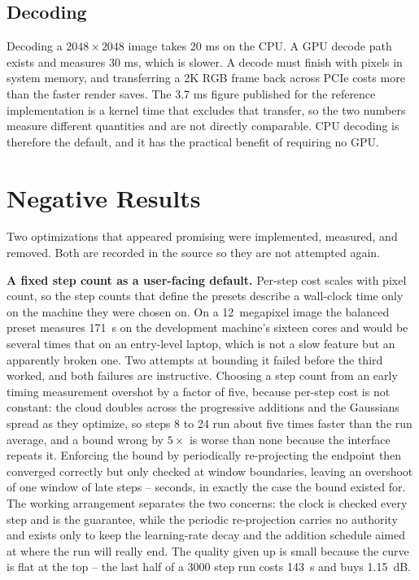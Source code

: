 \documentclass[11pt,a4paper]{article}
\begin{document}
\subsection{Decoding}

Decoding a $2048\times2048$ image takes 20 ms on the CPU. A GPU decode path exists and measures 30 ms, which is slower. A decode must finish with pixels in system memory, and transferring a 2K RGB frame back across PCIe costs more than the faster render saves. The 3.7 ms figure published for the reference implementation is a kernel time that excludes that transfer, so the two numbers measure different quantities and are not directly comparable. CPU decoding is therefore the default, and it has the practical benefit of requiring no GPU.

\newpage

\section{Negative Results}

Two optimizations that appeared promising were implemented, measured, and removed. Both are recorded in the source so they are not attempted again.

\textbf{A fixed step count as a user-facing default.} Per-step cost scales with pixel count, so the step counts that define the presets describe a wall-clock time only on the machine they were chosen on. On a 12~megapixel image the balanced preset measures 171~s on the development machine's sixteen cores and would be several times that on an entry-level laptop, which is not a slow feature but an apparently broken one. Two attempts at bounding it failed before the third worked, and both failures are instructive. Choosing a step count from an early timing measurement overshot by a factor of five, because per-step cost is not constant: the cloud doubles across the progressive additions and the Gaussians spread as they optimize, so steps 8 to 24 run about five times faster than the run average, and a bound wrong by $5\times$ is worse than none because the interface repeats it. Enforcing the bound by periodically re-projecting the endpoint then converged correctly but only checked at window boundaries, leaving an overshoot of one window of late steps -- seconds, in exactly the case the bound existed for. The working arrangement separates the two concerns: the clock is checked every step and is the guarantee, while the periodic re-projection carries no authority and exists only to keep the learning-rate decay and the addition schedule aimed at where the run will really end. The quality given up is small because the curve is flat at the top -- the last half of a 3000 step run costs 143~s and buys 1.15~dB.
\end{document}
